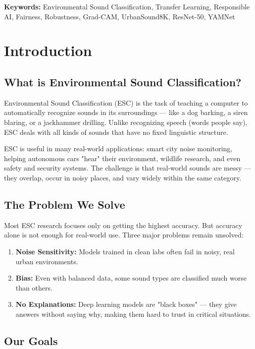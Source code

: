 \documentclass[11pt,a4paper]{article}
\begin{document}
\textbf{Keywords:} Environmental Sound Classification, Transfer Learning, Responsible AI, Fairness, Robustness, Grad-CAM, UrbanSound8K, ResNet-50, YAMNet

\tableofcontents
\newpage

\section{\textcolor{iitjblue}{Introduction}}

\subsection{What is Environmental Sound Classification?}

Environmental Sound Classification (ESC) is the task of teaching a computer to automatically recognize sounds in its surroundings — like a dog barking, a siren blaring, or a jackhammer drilling. Unlike recognizing speech (words people say), ESC deals with all kinds of sounds that have no fixed linguistic structure.

ESC is useful in many real-world applications: smart city noise monitoring, helping autonomous cars "hear" their environment, wildlife research, and even safety and security systems. The challenge is that real-world sounds are messy — they overlap, occur in noisy places, and vary widely within the same category.

\subsection{The Problem We Solve}

Most ESC research focuses only on getting the highest accuracy. But accuracy alone is not enough for real-world use. Three major problems remain unsolved:

\begin{enumerate}[noitemsep]
    \item \textbf{Noise Sensitivity:} Models trained in clean labs often fail in noisy, real urban environments.
    \item \textbf{Bias:} Even with balanced data, some sound types are classified much worse than others.
    \item \textbf{No Explanations:} Deep learning models are "black boxes" — they give answers without saying why, making them hard to trust in critical situations.
\end{enumerate}

\subsection{Our Goals}
\end{document}
